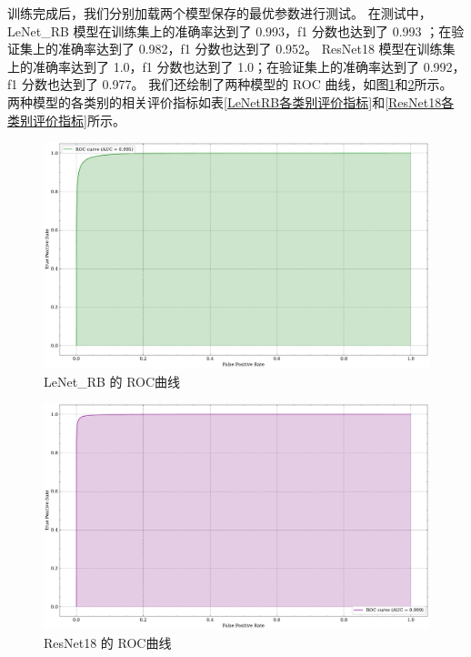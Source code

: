 \documentclass[supercite]{Experimental_Report}
\theoremstyle{definition}
\begin{document}
训练完成后，我们分别加载两个模型保存的最优参数进行测试。
在测试中，LeNet\_RB 模型在训练集上的准确率达到了 0.993，f1 分数也达到了 0.993 ；在验证集上的准确率达到了 0.982，f1 分数也达到了 0.952。
ResNet18 模型在训练集上的准确率达到了 1.0，f1 分数也达到了 1.0；在验证集上的准确率达到了 0.992，f1 分数也达到了 0.977。
我们还绘制了两种模型的 ROC 曲线，如图\ref{LeNetRBROC曲线}和\ref{ResNet18ROC曲线}所示。
两种模型的各类别的相关评价指标如表\ref{LeNetRB各类别评价指标}和\ref{ResNet18各类别评价指标}所示。
\begin{figure}[H]
	\begin{center}
		\includegraphics[scale=0.4]{../images/LeNetRBROC曲线.pdf}
		\caption{LeNet\_RB 的 ROC曲线}
		\label{LeNetRBROC曲线}
	\end{center}
\end{figure}
\begin{figure}[H]
	\begin{center}
		\includegraphics[scale=0.4]{../images/ResNet18ROC曲线.pdf}
		\caption{ResNet18 的 ROC曲线}
		\label{ResNet18ROC曲线}
	\end{center}
\end{figure}
\end{document}
